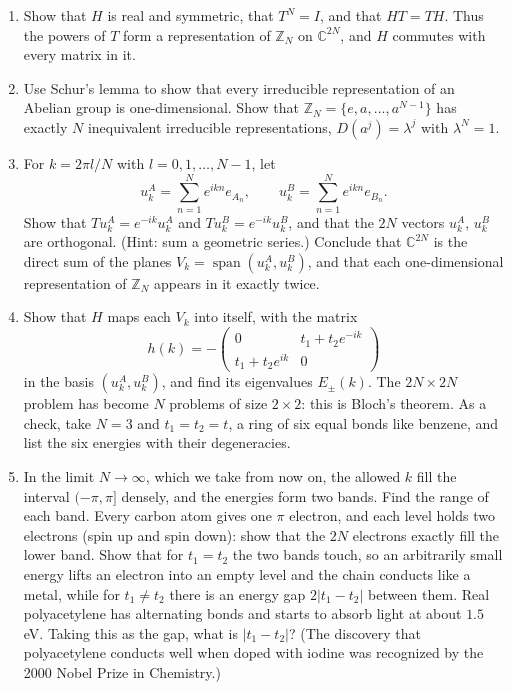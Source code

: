 \documentclass[11pt,a4paper]{article}
\makeatletter
\newcommand{\Z}{\mathbb{Z}}
\newcommand{\C}{\mathbb{C}}
\DeclareMathOperator{\spn}{span}
\newcommand{\showsolution}[1]{%
  \ifdefined\withsolutions\@ifundefined{sol@#1}{}{%
    \par\vspace{0.6em}\noindent\textbf{Solution.}\par\vspace{0.1em}{\sloppy\@nameuse{sol@#1}\par}\vspace{0.4em}\hrule}\fi}
\makeatother
\begin{document}
\begin{enumerate}
  \item Show that $H$ is real and symmetric, that $T^N = I$, and that $HT = TH$. Thus the powers of $T$ form a representation of $\Z_N$ on $\C^{2N}$, and $H$ commutes with every matrix in it.
  \item Use Schur's lemma to show that every irreducible representation of an Abelian group is one-dimensional. Show that $\Z_N = \{e, a, \dots, a^{N-1}\}$ has exactly $N$ inequivalent irreducible representations, $D(a^j) = \lambda^j$ with $\lambda^N = 1$.
  \item For $k = 2\pi l/N$ with $l = 0, 1, \dots, N - 1$, let
  \[
    u^A_k = \sum_{n=1}^{N} e^{ikn} e_{A_n}, \qquad u^B_k = \sum_{n=1}^{N} e^{ikn} e_{B_n}.
  \]
  Show that $Tu^A_k = e^{-ik}u^A_k$ and $Tu^B_k = e^{-ik}u^B_k$, and that the $2N$ vectors $u^A_k$, $u^B_k$ are orthogonal. (Hint: sum a geometric series.) Conclude that $\C^{2N}$ is the direct sum of the planes $V_k = \spn(u^A_k, u^B_k)$, and that each one-dimensional representation of $\Z_N$ appears in it exactly twice.
  \item Show that $H$ maps each $V_k$ into itself, with the matrix
  \[
    h(k) = -\begin{pmatrix} 0 & t_1 + t_2e^{-ik} \\ t_1 + t_2e^{ik} & 0 \end{pmatrix}
  \]
  in the basis $(u^A_k, u^B_k)$, and find its eigenvalues $E_\pm(k)$. The $2N \times 2N$ problem has become $N$ problems of size $2 \times 2$: this is Bloch's theorem. As a check, take $N = 3$ and $t_1 = t_2 = t$, a ring of six equal bonds like benzene, and list the six energies with their degeneracies.
  \item In the limit $N \to \infty$, which we take from now on, the allowed $k$ fill the interval $(-\pi, \pi]$ densely, and the energies form two bands. Find the range of each band. Every carbon atom gives one $\pi$ electron, and each level holds two electrons (spin up and spin down): show that the $2N$ electrons exactly fill the lower band. Show that for $t_1 = t_2$ the two bands touch, so an arbitrarily small energy lifts an electron into an empty level and the chain conducts like a metal, while for $t_1 \ne t_2$ there is an energy gap $2|t_1 - t_2|$ between them. Real polyacetylene has alternating bonds and starts to absorb light at about $1.5$\,eV. Taking this as the gap, what is $|t_1 - t_2|$? (The discovery that polyacetylene conducts well when doped with iodine was recognized by the 2000 Nobel Prize in Chemistry.)
\end{enumerate}
\showsolution{24}
\end{document}
